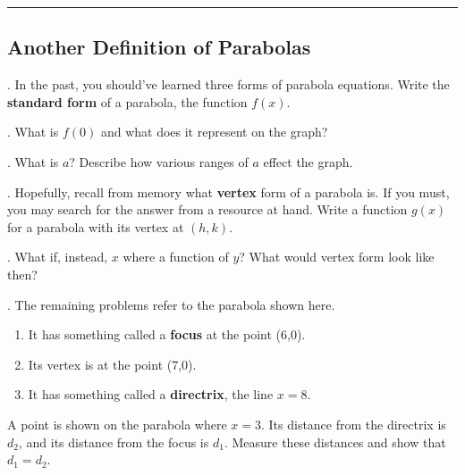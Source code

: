 \renewcommand{\columnseprule}{1.5pt}
\begin{multicols*}{2}
\noindent
\rule[0.5\baselineskip]{0.5\textwidth}{1pt}

\noindent
\subsection{Another Definition of Parabolas}
. In the past, you should've learned three forms of parabola equations.
Write the \textbf{standard form} of a parabola, the function
$f(x)$.  

\vspace{2cm}
. What is $f(0)$ and what does it represent on the graph?

\vspace{2cm}
. What is $a$?  Describe how various ranges of $a$ effect the graph.

\vspace{3cm}
. Hopefully, recall from memory what \textbf{vertex} form of a parabola
is.  If you must, you may search for the answer from a resource at hand.
Write a function $g(x)$ for a parabola with its vertex at $(h,k)$.

\vspace{3cm}
.  What if, instead, $x$ where a function of $y$?  What would vertex form
look like then?

\vspace{2cm}
. The remaining problems refer to the parabola shown here.
\begin{enumerate}
\item It has something called a \textbf{focus} at the point (6,0).
\item Its vertex is at the point (7,0).
\item It has something called a \textbf{directrix}, the line $x=8$.
\end{enumerate}
A point is shown on the parabola where $x=3$.  Its distance from the
directrix is $d_2$, and its distance from the focus is $d_1$.  Measure
these distances and show that $d_1 = d_2$.
 


\end{multicols*}
